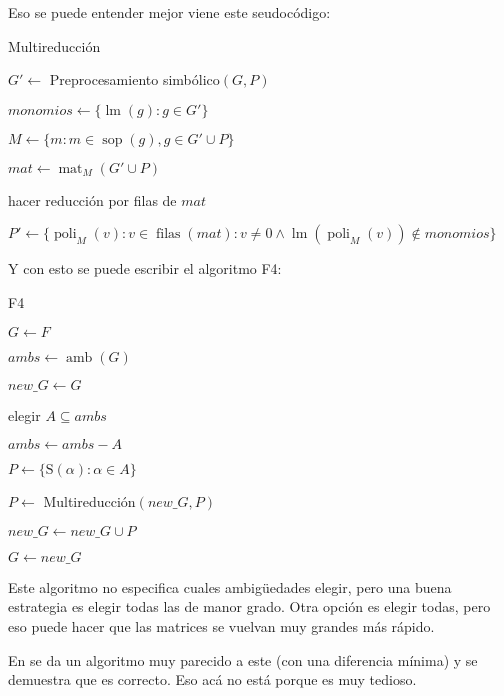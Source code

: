 \documentclass{report}
\theoremstyle{customstyle}
\theoremstyle{factstyle}
\DeclareMathOperator{\sop}{sop}
\DeclareMathOperator{\lm}{lm}
\DeclareMathOperator{\amb}{amb}
\renewcommand{\S}{\text{S}}
\DeclareMathOperator{\mat}{mat}
\DeclareMathOperator{\poli}{poli}
\DeclareMathOperator{\filas}{filas}
\begin{document}
Eso se puede entender mejor viene este seudocódigo:

\begin{algorithm}[H] %
  \caption{Multireducción}\label{alg:Multireducción}
  $G' ←$ Preprocesamiento simbólico$(G, P)$

  $monomios ← \{\lm(g) : g ∈ G'\}$

  $M ← \{m : m ∈ \sop(g), g ∈ G' ∪ P\}$

  $mat ← \mat_M(G' ∪ P)$

  hacer reducción por filas de $mat$

  $P' ← \{\poli_M(v) : v ∈ \filas(mat) : v ≠ 0 ∧ \lm(\poli_M(v)) ∉ monomios\}$

\end{algorithm}

Y con esto se puede escribir el algoritmo F4:

\begin{algorithm}[H] %
  \caption{F4}\label{alg:F4}
  $G ← F$

  \Loop{} {
    $ambs ← \amb(G)$

    $new\_G ← G$

     {
      elegir $Α ⊆ ambs$

      $ambs ← ambs - Α$

      $P ← \{\S(α) : α ∈ Α\}$

      $P ←$ Multireducción$(new\_G, P)$

      $new\_G ← new\_G ∪ P$
    }

     {
      \Break
    }

    $G ← new\_G$
  }

\end{algorithm}

Este algoritmo no especifica cuales ambigüedades elegir, pero una buena estrategia es elegir todas las de manor grado. Otra opción es elegir todas, pero eso puede hacer que las matrices se vuelvan muy grandes más rápido.

En \cite{thesis:Hof20} se da un algoritmo muy parecido a este (con una diferencia mínima) y se demuestra que es correcto. Eso acá no está porque es muy tedioso.
\end{document}
